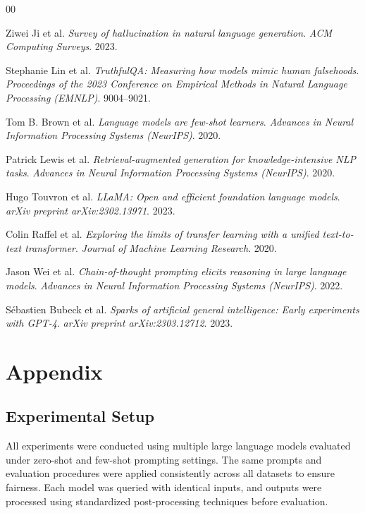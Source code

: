 \documentclass[sigconf,nonacm]{acmart}
\begin{document}

\begin{thebibliography}{00}

Ziwei Ji et al.
\textit{Survey of hallucination in natural language generation}.
\textit{ACM Computing Surveys}. 2023.

Stephanie Lin et al.
\textit{TruthfulQA: Measuring how models mimic human falsehoods}.
\textit{Proceedings of the 2023 Conference on Empirical Methods in Natural Language Processing (EMNLP)}. 9004--9021.

Tom B. Brown et al.
\textit{Language models are few-shot learners}.
\textit{Advances in Neural Information Processing Systems (NeurIPS)}. 2020.

Patrick Lewis et al.
\textit{Retrieval-augmented generation for knowledge-intensive NLP tasks}.
\textit{Advances in Neural Information Processing Systems (NeurIPS)}. 2020.

Hugo Touvron et al.
\textit{LLaMA: Open and efficient foundation language models}.
\textit{arXiv preprint arXiv:2302.13971}. 2023.

Colin Raffel et al.
\textit{Exploring the limits of transfer learning with a unified text-to-text transformer}.
\textit{Journal of Machine Learning Research}. 2020.

Jason Wei et al.
\textit{Chain-of-thought prompting elicits reasoning in large language models}.
\textit{Advances in Neural Information Processing Systems (NeurIPS)}. 2022.

Sébastien Bubeck et al.
\textit{Sparks of artificial general intelligence: Early experiments with GPT-4}.
\textit{arXiv preprint arXiv:2303.12712}. 2023.
\end{thebibliography}

\appendix

\section{Appendix}

\subsection{Experimental Setup}

All experiments were conducted using multiple large language models evaluated under zero-shot and few-shot prompting settings. The same prompts and evaluation procedures were applied consistently across all datasets to ensure fairness. Each model was queried with identical inputs, and outputs were processed using standardized post-processing techniques before evaluation.
\end{document}
